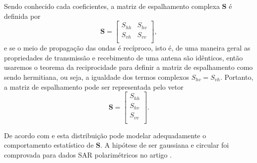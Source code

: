 \documentclass[conference]{IEEEtran}
\begin{document}
Sendo conhecido cada coeficientes, a matriz de espalhamento complexa $\mathbf{S}$ é definida por
\begin{equation}
\mathbf{S} = \left[
\begin{array}{cc}
	S_{hh}   & S_{hv}   \\
	S_{vh}   & S_{vv}   \\
\end{array}
\right],
\end{equation}
e se o meio de propagação das ondas é recíproco, isto é, de uma maneira geral as propriedades de transmissão e recebimento de uma antena são idênticos, então usaremos o teorema da reciprocidade \cite{lp} para definir a matriz de espalhamento como sendo hermitiana, ou seja, a igualdade dos termos complexos $S_{hv}=S_{vh}$. Portanto, a matriz de espalhamento pode ser representada pelo vetor
\begin{equation}
\mathbf{S} = \left[
\begin{array}{c}
	S_{hh}     \\
    S_{hv}     \\
	S_{vv}     \\
\end{array}
\right].
\end{equation}

De acordo com \cite{good} e \cite{lee} esta distribuição pode modelar adequadamente o comportamento estatístico de $\mathbf{S}$. A hipótese de ser gaussiana e circular foi comprovada para dados SAR polarimétricos no artigo \cite{sarabendi}.   
\end{document}
